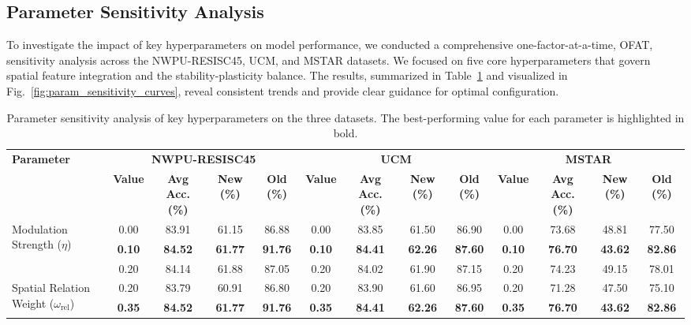 ﻿\documentclass[letterpaper,journal]{IEEEtran}
\begin{document}
\subsection{Parameter Sensitivity Analysis}
To investigate the impact of key hyperparameters on model performance, we conducted a comprehensive one-factor-at-a-time, OFAT, sensitivity analysis across the NWPU-RESISC45, UCM, and MSTAR datasets. We focused on five core hyperparameters that govern spatial feature integration and the stability-plasticity balance. The results, summarized in Table~\ref{tab:sensitivity_analysis_table} and visualized in Fig.~\ref{fig:param_sensitivity_curves}, reveal consistent trends and provide clear guidance for optimal configuration.

\begin{table}[!t]
\centering
\caption{Parameter sensitivity analysis of key hyperparameters on the three datasets. The best-performing value for each parameter is highlighted in bold.}
\label{tab:sensitivity_analysis_table}
{\setlength{\tabcolsep}{2.5pt}\scriptsize
\begin{tabular}{@{}l c ccc c ccc c ccc@{}}
\toprule
\multirow{2}{*}{\textbf{Parameter}} & \multicolumn{4}{c}{\textbf{NWPU-RESISC45}} & \multicolumn{4}{c}{\textbf{UCM}} & \multicolumn{4}{c}{\textbf{MSTAR}} \\
\cmidrule(lr){2-5} \cmidrule(lr){6-9} \cmidrule(lr){10-13}
& \textbf{Value} & \textbf{Avg Acc. (\%)} & \textbf{New (\%)} & \textbf{Old (\%)} & \textbf{Value} & \textbf{Avg Acc. (\%)} & \textbf{New (\%)} & \textbf{Old (\%)} & \textbf{Value} & \textbf{Avg Acc. (\%)} & \textbf{New (\%)} & \textbf{Old (\%)} \\
\midrule
\multirow{3}{*}{Modulation Strength ($\eta$)}
& 0.00 & 83.91 & 61.15 & 86.88 & 0.00 & 83.85 & 61.50 & 86.90 & 0.00 & 73.68 & 48.81 & 77.50 \\
& \textbf{0.10} & \textbf{84.52} & \textbf{61.77} & \textbf{91.76} & \textbf{0.10} & \textbf{84.41} & \textbf{62.26} & \textbf{87.60} & \textbf{0.10} & \textbf{76.70} & \textbf{43.62} & \textbf{82.86} \\
& 0.20 & 84.14 & 61.88 & 87.05 & 0.20 & 84.02 & 61.90 & 87.15 & 0.20 & 74.23 & 49.15 & 78.01 \\
\midrule
\multirow{3}{*}{Spatial Relation Weight  ($\omega_{\text{rel}}$)}
& 0.20 & 83.79 & 60.91 & 86.80 & 0.20 & 83.90 & 61.60 & 86.95 & 0.20 & 71.28 & 47.50 & 75.10 \\
& \textbf{0.35} & \textbf{84.52} & \textbf{61.77} & \textbf{91.76} & \textbf{0.35} & \textbf{84.41} & \textbf{62.26} & \textbf{87.60} & \textbf{0.35} & \textbf{76.70} & \textbf{43.62} & \textbf{82.86} \\

\end{tabular}}
\end{table}
\end{document}
